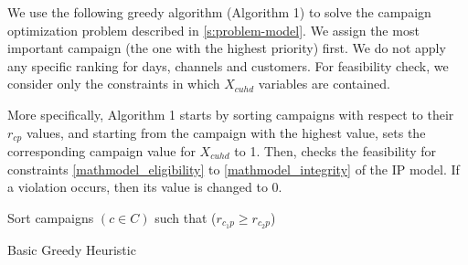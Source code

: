 \documentclass[11pt]{article}
\begin{document}
We use the following greedy algorithm (Algorithm 1) to solve the campaign optimization problem described in \ref{s:problem-model}. We assign  the most important campaign (the one with the highest priority) first. We do not apply any specific ranking for days, channels and customers. For feasibility check, we consider only the constraints in which $X_{{c}{u}{h}{d}}$ variables are contained.

More specifically, Algorithm 1 starts by sorting campaigns with respect to their $r_{cp}$ values, and starting from the campaign with the highest value, sets the corresponding campaign value for $X_{cuhd}$ to 1. Then, checks the feasibility for constraints \eqref{mathmodel_eligibility} to \eqref{mathmodel_integrity} of the IP model. If a violation occurs, then its value is changed to 0.  

\begin{singlespace}

\begin{algorithm}[H]
\DontPrintSemicolon
{}

Sort campaigns $(c \in C)$ such that ($r_{c_{1}p} \geq r_{c_{2}p}$)\\
\;
\caption{Basic Greedy Heuristic}
\label{algo:greedy_impl1}
\end{algorithm}
\end{singlespace}
\end{document}
